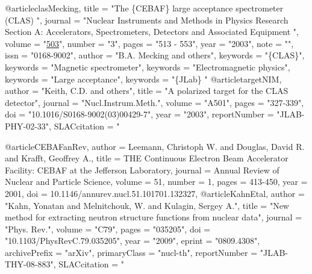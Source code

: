 @article{clasMecking,
title = "The \{CEBAF\} large acceptance spectrometer (CLAS) ",
journal = "Nuclear Instruments and Methods in Physics Research Section A: Accelerators, Spectrometers, Detectors and Associated Equipment ",
volume = "\href{http://www.sciencedirect.com/science/article/pii/S0168900203010015}{503}",
number = "3",
pages = "513 - 553",
year = "2003",
note = "",
issn = "0168-9002",
author = "B.A. Mecking and others",
keywords = "\{CLAS\}",
keywords = "Magnetic spectrometer",
keywords = "Electromagnetic physics",
keywords = "Large acceptance",
keywords = "\{JLab\} "
}
@article{targetNIM,
      author         = "Keith, C.D. and others",
      title          = "{A polarized target for the CLAS detector}",
      journal        = "Nucl.Instrum.Meth.",
      volume         = "A501",
      pages          = "327-339",
      doi            = "10.1016/S0168-9002(03)00429-7",
      year           = "2003",
      reportNumber   = "JLAB-PHY-02-33",
      SLACcitation   = "%
}

@article{CEBAFanRev,
author = {Leemann, Christoph W. and Douglas, David R. and Krafft, Geoffrey A.},
title = {THE Continuous Electron Beam Accelerator Facility: CEBAF at the Jefferson Laboratory},
journal = {Annual Review of Nuclear and Particle Science},
volume = {51},
number = {1},
pages = {413-450},
year = {2001},
doi = {10.1146/annurev.nucl.51.101701.132327},
}
@article{KahnEtal,
      author         = "Kahn, Yonatan and Melnitchouk, W. and Kulagin, Sergey A.",
      title          = "{New method for extracting neutron structure functions from nuclear data}",
      journal        = "Phys. Rev.",
      volume         = "C79",
      pages          = "035205",
      doi            = "10.1103/PhysRevC.79.035205",
      year           = "2009",
      eprint         = "0809.4308",
      archivePrefix  = "arXiv",
      primaryClass   = "nucl-th",
      reportNumber   = "JLAB-THY-08-883",
      SLACcitation   = "%
}

